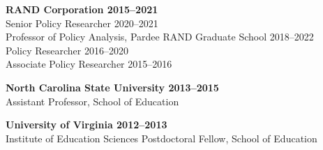 \documentclass[11pt, letterpaper]{article}
\begin{document}
\textbf{RAND Corporation \hfill 2015--2021 \\}
Senior Policy Researcher \hfill 2020--2021 \\
Professor of Policy Analysis, Pardee RAND Graduate School \hfill 2018--2022 \\
Policy Researcher \hfill 2016--2020 \\
Associate Policy Researcher \hfill 2015--2016

\textbf{North Carolina State University \hfill 2013--2015 \\}
Assistant Professor, School of Education

\textbf{University of Virginia \hfill 2012--2013 \\}
Institute of Education Sciences Postdoctoral Fellow, School of Education


\end{document}
